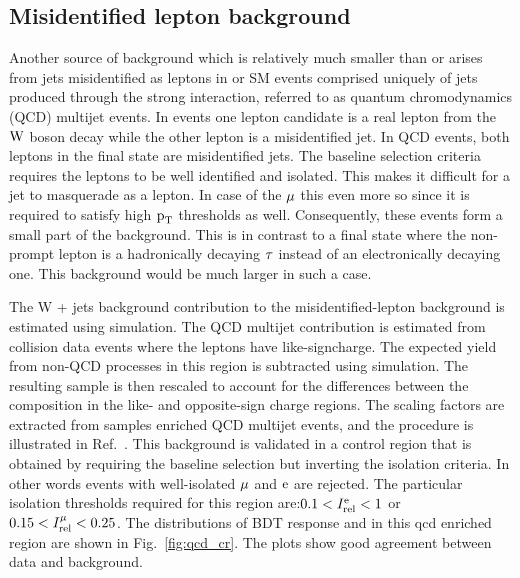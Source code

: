 \subsection{Misidentified lepton background}
\label{h125_misid_bg}
Another source of background which is relatively much smaller than \ttb or \ztt arises from jets misidentified as leptons in \wjets or SM events comprised uniquely of jets produced through the strong interaction, referred to as quantum chromodynamics (QCD) multijet events. In \wjets events one lepton candidate is a real lepton from the $\text{W}$ boson decay while the other lepton is a misidentified jet. In QCD events, both leptons in the final state are misidentified jets. The baseline selection criteria requires the leptons to be well identified and isolated. This makes it difficult for a jet to masquerade as a lepton. In case of the $\mu$ this even more so since it is required to satisfy high $\text{p}_\text{T}$ thresholds as well. Consequently, these events form a small part of the background. This is in contrast to a final state where the non-prompt lepton is a hadronically decaying $\tau$ instead of an electronically decaying one. This background would be much larger in such a case.

The W + jets background contribution to the misidentified-lepton background is estimated using simulation. The QCD multijet contribution is estimated from collision data events where the leptons have like-signcharge. The expected yield from non-QCD processes in this region is subtracted using simulation. The resulting sample is then rescaled to account for the differences between the composition in the like- and opposite-sign charge regions. The scaling factors are extracted from samples enriched  QCD multijet events, and the procedure is illustrated in Ref.~\cite{}. This background is validated in a control region that is obtained by requiring the baseline selection but inverting the isolation criteria. In other words events with well-isolated $\mu$ and $\text{e}$ are rejected. The particular isolation thresholds required for this region are:$0.1 < I_\text{rel}^{\text{e}} < 1$ or $0.15 < I_\text{rel}^{\mu} < 0.25$. The distributions of BDT response and \mcol in this qcd enriched region are shown in Fig.~\ref{fig:qcd_cr}. The plots show good agreement between data and background.




